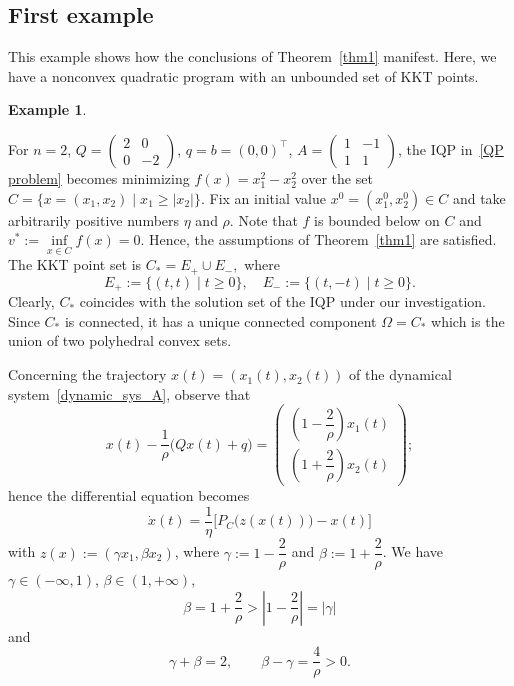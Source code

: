 \documentclass[11pt]{article}
\theoremstyle{definition}
\newtheorem{example}{Example}
\theoremstyle{remark}
\begin{document}
\subsection{First example}
This example shows how the conclusions of Theorem~\ref{thm1} manifest. Here, we have a nonconvex quadratic program with an unbounded set of KKT points.
	\begin{example}\label{ex:1}
		{\rm			
			For $n=2$, $Q=\begin{pmatrix}2&0\\0&-2\end{pmatrix}$, $q=b=(0,0)^\top$, $A=\begin{pmatrix}1&-1\\1&1\end{pmatrix}$, the IQP in~\eqref{QP problem} becomes minimizing $f(x)=x_1^2-x_2^2$ over the set $C=\{x=(x_1,x_2)\mid x_1\geq|x_2|\}.$ Fix an initial value $x^0=(x_1^0,x_2^0)\in C$ and take arbitrarily positive numbers $\eta$ and $\rho$. Note that $f$ is bounded below on $C$ and $v^*:=\inf\limits_{x\in C}f(x)=0$.  Hence, the assumptions of Theorem~\ref{thm1} are satisfied. The KKT point set is $C_*=E_+\cup E_-,$
			where
			$$E_+:=\{(t,t)\mid t\geq0\},\quad E_-:=\{(t,-t)\mid t\geq0\}.$$
			Clearly, $C_*$ coincides with the solution set of the IQP under our investigation. Since $C_*$ is connected, it has a unique connected component $\Omega=C_*$ which is the union of two polyhedral convex sets.
			
			Concerning the trajectory $x(t)=(x_1(t),x_2(t))$ of the dynamical system~\eqref{dynamic_sys_A}, observe that $$x(t)-\dfrac{1}{\rho}\big(Qx(t)+q\big)= \begin{pmatrix}\left(1-\dfrac2\rho\right)x_1(t)\\[1.5ex]\left(1+\dfrac2\rho\right)x_2(t)\end{pmatrix};$$
			 hence the differential equation becomes
			\begin{equation}\label{eq:ode_start}
				\dot x(t)=\dfrac{1}{\eta}\big[P_C\big(z(x(t))\big)-x(t)\big]
			\end{equation}
			with $z(x):=(\gamma x_1,\beta x_2)$, where $\gamma:=1-\dfrac2\rho$ and $\beta:=1+\dfrac2\rho$. We have $\gamma\in(-\infty,1)$, $\beta\in(1,+\infty)$, 
			\begin{equation}\label{eq:ab_identities_new}
			\beta = 1 + \frac{2}{\rho} > \left|1 - \frac{2}{\rho}\right| = |\gamma|
			\end{equation}
			and 
			\begin{equation}\label{eq:ab_identities}
				\gamma+\beta=2,\qquad \beta-\gamma=\frac4\rho>0.
			\end{equation}
			
}
\end{example}
\end{document}
